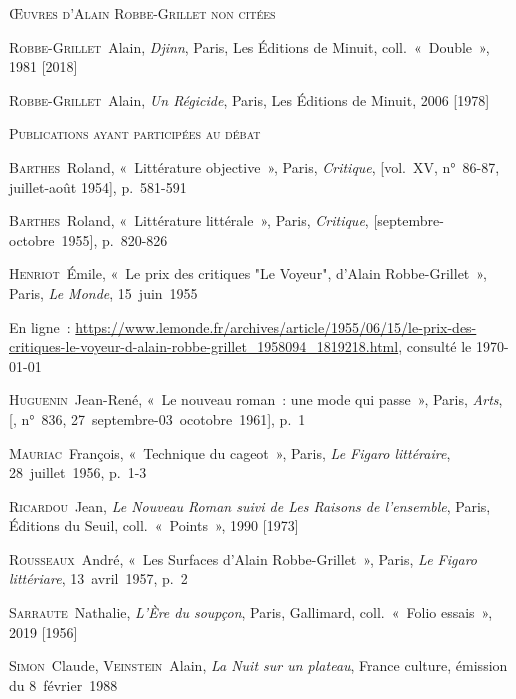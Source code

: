 \documentclass[12pt, a4paper]{article}
\begin{document}
        \vspace*{2cm}
        \setlength{\parindent}{0cm}
{\large\textsc{Œuvres d'Alain Robbe-Grillet non citées}}
        \vspace*{1cm}
        \setlength{\parindent}{25pt}
        
        
        

        
        \textsc{Robbe-Grillet}~Alain, \textit{Djinn}, Paris, Les Éditions de Minuit, coll.~«~Double~», 1981 [2018]\par 
    \textsc{Robbe-Grillet}~Alain, \textit{Un Régicide}, Paris, Les Éditions de Minuit, 2006 [1978]\par 
    
        \vspace*{2cm}
        \setlength{\parindent}{0cm}
{\large\textsc{Publications ayant participées au débat}}
        \vspace*{1cm}
        \setlength{\parindent}{25pt}
        
        
        

        
        \textsc{Barthes}~Roland, «~Littérature objective~», Paris, \textit{Critique}, [vol.~XV, n°~86-87, juillet-août 1954], p.~581-591\par
    \textsc{Barthes}~Roland, «~Littérature littérale~», Paris, \textit{Critique}, [septembre-octobre~1955], p.~820-826\par
    \textsc{Henriot}~Émile, «~Le prix des critiques "Le Voyeur", d'Alain Robbe-Grillet~», Paris, \textit{Le Monde}, 15~juin~1955
            
            En ligne~: \hyperlink{https://www.lemonde.fr/archives/article/1955/06/15/le-prix-des-critiques-le-voyeur-d-alain-robbe-grillet\_1958094\_1819218.html}{https://www.lemonde.fr/archives/article/1955/06/15/le-prix-des-critiques-le-voyeur-d-alain-robbe-grillet\_1958094\_1819218.html}, consulté le \today
        \par
    \textsc{Huguenin}~Jean-René, «~Le nouveau roman~: une mode qui passe~», Paris, \textit{Arts}, [, n°~836, 27~septembre-03~ocotobre~1961], p.~1\par
    \textsc{Mauriac}~François, «~Technique du cageot~», Paris, \textit{Le Figaro littéraire}, 28~juillet~1956, p.~1-3\par
    \textsc{Ricardou}~Jean, \textit{Le Nouveau Roman suivi de Les Raisons de l'ensemble}, Paris, Éditions du Seuil, coll.~«~Points~», 1990 [1973]\par 
    \textsc{Rousseaux}~André, «~Les Surfaces d'Alain Robbe-Grillet~», Paris, \textit{Le Figaro littériare}, 13~avril~1957, p.~2\par
    \textsc{Sarraute}~Nathalie, \textit{L'Ère du soupçon}, Paris, Gallimard, coll.~«~Folio essais~», 2019 [1956]\par 
    \textsc{Simon}~Claude, \textsc{Veinstein}~Alain, \textit{La Nuit sur un plateau}, France culture, émission du 8~février~1988
            
\end{document}
